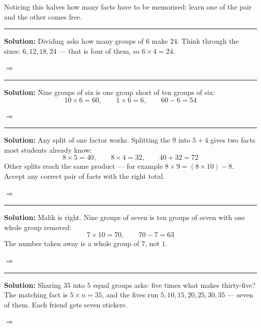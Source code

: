 \documentclass[12pt]{article}
\begin{document}
Noticing this halves how many facts have to be memorised: learn one of the pair and the other comes free.

\vspace{0.15cm}\noindent\rule{\linewidth}{0.2pt}


\textbf{Solution:} Dividing asks how many groups of $6$ make $24$. Think through the sixes: $6, 12, 18, 24$ --- that is four of them, so $6 \times 4 = 24$.

$\Rightarrow$ 

\vspace{0.15cm}\noindent\rule{\linewidth}{0.2pt}


\textbf{Solution:} Nine groups of six is one group short of ten groups of six:
\[ 10 \times 6 = 60, \qquad 1 \times 6 = 6, \qquad 60 - 6 = 54 \]

$\Rightarrow$ 

\vspace{0.15cm}\noindent\rule{\linewidth}{0.2pt}


\textbf{Solution:} Any split of one factor works. Splitting the $9$ into $5 + 4$ gives two facts most students already know:
\[ 8 \times 5 = 40, \qquad 8 \times 4 = 32, \qquad 40 + 32 = 72 \]
Other splits reach the same product --- for example $8 \times 9 = (8 \times 10) - 8$. Accept any correct pair of facts with the right total.

$\Rightarrow$ 

\vspace{0.15cm}\noindent\rule{\linewidth}{0.2pt}


\textbf{Solution:} Malik is right. Nine groups of seven is ten groups of seven with one whole group removed:
\[ 7 \times 10 = 70, \qquad 70 - 7 = 63 \]
The number taken away is a whole group of $7$, not $1$.

$\Rightarrow$ 

\vspace{0.15cm}\noindent\rule{\linewidth}{0.2pt}


\textbf{Solution:} Sharing $35$ into $5$ equal groups asks: five times what makes thirty-five? The matching fact is $5 \times n = 35$, and the fives run $5, 10, 15, 20, 25, 30, 35$ --- seven of them. Each friend gets seven stickers.

$\Rightarrow$ 
\end{document}

